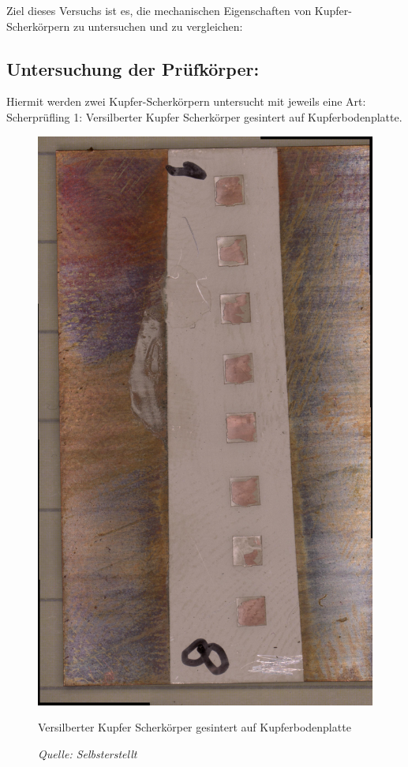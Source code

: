 Ziel dieses Versuchs ist es, die mechanischen Eigenschaften von Kupfer-Scherkörpern zu
untersuchen und zu vergleichen:\\
\subsection{Untersuchung der Prüfkörper:}
Hiermit werden zwei Kupfer-Scherkörpern untersucht mit jeweils eine Art:\\
Scherprüfling 1: Versilberter Kupfer Scherkörper gesintert auf Kupferbodenplatte.\\
\vspace{0.05cm}
\begin{figure}[h]
    \centering
    \includegraphics[scale=0.1, angle=90]{Bilder/Bodenplatte_Sintern_Gesamt.jpg}
    \caption{Versilberter Kupfer Scherkörper gesintert auf Kupferbodenplatte}
    \caption*{\textit{Quelle: Selbsterstellt}}
    \vspace{0.2cm}
    \label{Abb.2: Versilberter Kupfer Scherkörper gesintert auf Kupferbodenplatte} 
\end{figure}\\
